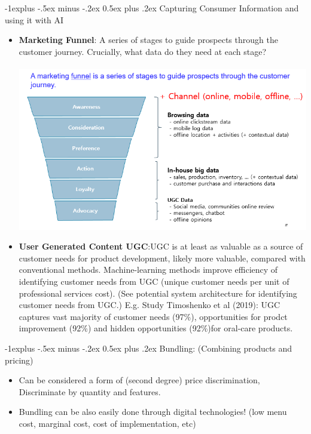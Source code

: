 \documentclass[12pt, landscape]{article}
\makeatletter
\renewcommand{\subsection}{\@startsection{subsection}{2}{0mm}%
                                {-1explus -.5ex minus -.2ex}%
                                {0.5ex plus .2ex}%
                                {\normalfont\normalsize\bfseries}}
\makeatother
\begin{document}
\begin{multicols*}{3}
\subsection{Capturing Consumer Information and using it with AI }
\begin{itemize}
\item \textbf{Marketing Funnel}: A series of stages to guide prospects through the customer journey. Crucially, what data do they need at each stage?
~\\ ~\\
\includegraphics[width = \linewidth]{marketingFunnel}
\item \textbf{User Generated Content UGC}:UGC is at least as valuable as a source of customer needs for product development, likely more valuable, compared with conventional methods. Machine-learning methods improve efficiency of identifying customer needs from UGC (unique customer needs per unit of professional services cost). (See potential system architecture for identifying customer needs from UGC.) E.g. Study Timoshenko et al (2019): UGC captures vast majority of customer needs (97\%), opportunities for prodct improvement (92\%) and hidden opportunities (92\%)for oral-care products.
\end{itemize}

\subsection{Bundling: (Combining products and pricing)}
\begin{itemize}
\item Can be considered a form of (second degree) price discrimination, Discriminate by quantity and features. 
\item Bundling can be also easily done through digital technologies! (low menu cost, marginal cost, cost of implementation, etc)
\end{itemize}


\end{multicols*}
\end{document}
